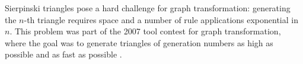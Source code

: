 Sierpinski triangles pose a hard challenge for graph transformation: generating the $n$-th triangle requires space and a number of rule applications exponential in $n$. This problem was part of the 2007 tool contest for graph transformation, where the goal was to generate triangles of generation numbers as high as possible and as fast as possible \cite{Taentzer_et_al08a}.
